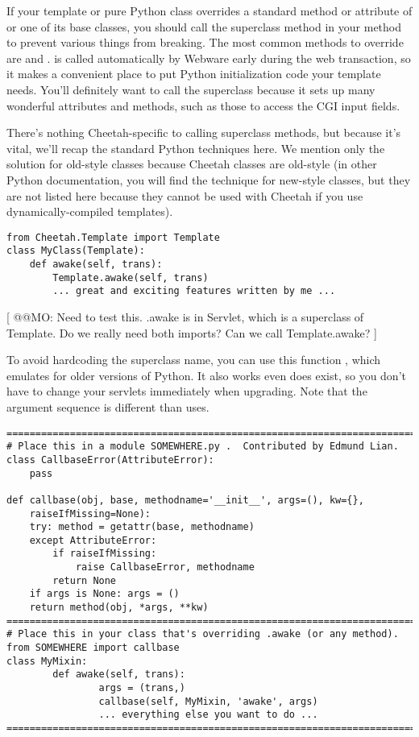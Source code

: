 If your template or pure Python class overrides a standard method or attribute
of  or one of its base classes, you should call the superclass
method in your method to prevent various things from breaking.  The most common
methods to override are  and .  
is called automatically by Webware early during the web transaction, so it makes
a convenient place to put Python initialization code your template needs.
You'll definitely want to call the superclass  because it sets up
many wonderful attributes and methods, such as those to access the CGI input
fields.

There's nothing Cheetah-specific to calling superclass methods, but
because it's vital, we'll recap the standard Python techniques
here. We mention only the solution for old-style classes because
Cheetah classes are old-style (in other Python documentation, you will
find the technique for new-style classes, but they are not listed here
because they cannot be used with Cheetah if you use
dynamically-compiled templates).

\begin{verbatim}
from Cheetah.Template import Template
class MyClass(Template):
	def awake(self, trans):
		Template.awake(self, trans)
		... great and exciting features written by me ...
\end{verbatim}

[ @@MO: Need to test this.  .awake is in Servlet, which is a superclass
of Template.  Do we really need both imports?  Can we call
Template.awake? ]

To avoid hardcoding the superclass name, you can use this
function , which emulates  for older versions of
Python.  It also works even  does exist, so you don't have to
change your servlets immediately when upgrading.  Note that the argument
sequence is different than  uses.

\begin{verbatim}
===========================================================================
# Place this in a module SOMEWHERE.py .  Contributed by Edmund Lian.
class CallbaseError(AttributeError):
    pass

def callbase(obj, base, methodname='__init__', args=(), kw={},
    raiseIfMissing=None):
    try: method = getattr(base, methodname)
    except AttributeError:
        if raiseIfMissing:
            raise CallbaseError, methodname
        return None
    if args is None: args = ()
    return method(obj, *args, **kw)
===========================================================================
# Place this in your class that's overriding .awake (or any method).
from SOMEWHERE import callbase
class MyMixin:
        def awake(self, trans):
                args = (trans,)
                callbase(self, MyMixin, 'awake', args)
                ... everything else you want to do ...
===========================================================================
\end{verbatim}

